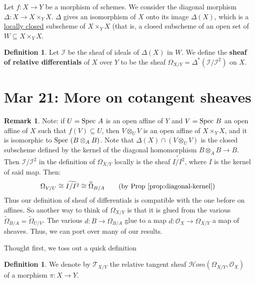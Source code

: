 \documentclass[10pt,reqno]{amsart}
\theoremstyle{definition}
\newtheorem{definition}[theorem]{Definition}
\newtheorem{remark}[theorem]{Remark}
\theoremstyle{remark}
\numberwithin{equation}{section}
\numberwithin{theorem}{section}
\newcommand{\OO}{{\mathcal O}}
\newcommand{\spec}{\textup{Spec }}
\newcommand{\scrHom}{\mathscr{H}om}
\newcommand{\TT}{{\mathscr T}}
\newcommand{\II}{{\mathscr I}}
\newcommand{\wt}{\widetilde}
\begin{document}
Let $f: X \to Y$ be a morphism of schemes. We consider the diagonal morphism $\Delta: X \to X \times_Y X$. $\Delta$ gives an isomorphism of $X$ onto its image $\Delta(X)$, which is a \underline{locally closed} subscheme of $X \times_Y X$ (that is, a closed subscheme of an open set of $W \subseteq X \times_Y X$.

\begin{definition}
Let $\II$ be the sheaf of ideals of $\Delta(X)$ in $W$. We define the \textbf{sheaf of relative differentials} of $X$ over $Y$ to be the sheaf $\Omega_{X/Y} = \Delta^*(\II/\II^2)$ on $X$.
\end{definition}
\section{Mar 21: More on cotangent sheaves}
\begin{remark}
Note: if $U = \spec A$ is an open affine of $Y$ and $V = \spec B$ an open affine of $X$ such that $f(V) \subseteq U$, then $V \otimes_U V$ is an open affine of $X \times_Y X$, and it is isomorphic  to $\spec (B \otimes_A B)$. Note that $\Delta(X) \cap (V \otimes_U V)$ is the closed subscheme defined by the kernel of the diagonal homomorphism $B \otimes_A B \to B$. Then $\II/\II^2$ in the definition of $\Omega_{X/Y}$ locally is the sheaf $\wt{I/I^2}$, where $I$ is the kernel of said map. Then:
\[\Omega_{V/U} \cong \wt{I/I^2} \cong \wt{\Omega}_{B/A} \tag{by Prop \ref{prop:diagonal-kernel}}\]
Thus our definition of sheaf of differentials is compatible with the one before on affines. So another way to think of $\Omega_{X/Y}$ is that it is glued from the various $\wt{\Omega}_{B/A} = \wt{\Omega}_{U/V}$. The various $d: B \to \Omega_{B/A}$ glue to a map $d: \OO_X \to \Omega_{X/Y}$ a map of sheaves. Thus, we can port over many of our results.
\end{remark}

Thought first, we toss out a quick definition
\begin{definition}
We denote by $\TT_{X/Y}$ the relative tangent sheaf $\scrHom(\Omega_{X/Y}, \OO_X)$ of a morphism $\pi: X \to Y$.
\end{definition}
\end{document}
